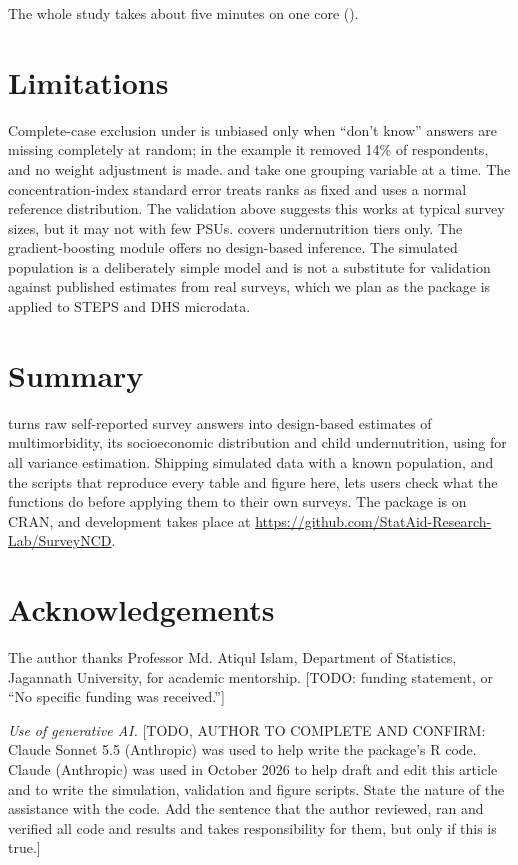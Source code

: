 The whole study takes about five minutes on one core ().

\section{Limitations}

Complete-case exclusion under  is unbiased only when ``don't know'' answers are missing completely at random; in the example it removed 14\% of respondents, and no weight adjustment is made.  and  take one grouping variable at a time. The concentration-index standard error treats ranks as fixed and uses a normal reference distribution. The validation above suggests this works at typical survey sizes, but it may not with few PSUs.  covers undernutrition tiers only. The gradient-boosting module offers no design-based inference. The simulated population is a deliberately simple model and is not a substitute for validation against published estimates from real surveys, which we plan as the package is applied to STEPS and DHS microdata.

\section{Summary}

 turns raw self-reported survey answers into design-based estimates of multimorbidity, its socioeconomic distribution and child undernutrition, using  for all variance estimation. Shipping simulated data with a known population, and the scripts that reproduce every table and figure here, lets users check what the functions do before applying them to their own surveys. The package is on CRAN, and development takes place at \url{https://github.com/StatAid-Research-Lab/SurveyNCD}.

\section{Acknowledgements}

The author thanks Professor Md. Atiqul Islam, Department of Statistics, Jagannath University, for academic mentorship. [TODO: funding statement, or ``No specific funding was received.'']

\emph{Use of generative AI.} [TODO, AUTHOR TO COMPLETE AND CONFIRM: Claude Sonnet 5.5 (Anthropic) was used to help write the package's R code. Claude (Anthropic) was used in October 2026 to help draft and edit this article and to write the simulation, validation and figure scripts. State the nature of the assistance with the code. Add the sentence that the author reviewed, ran and verified all code and results and takes responsibility for them, but only if this is true.]



\address{%
Sujon Mia\\
StatAid Research Lab\\
Department of Statistics, Jagannath University\\
Dhaka, Bangladesh\\
\textit{ORCID: \href{https://orcid.org/0009-0001-1032-2818}{0009-0001-1032-2818}}\\
\href{mailto:sujonsgc@gmail.com}{\nolinkurl{sujonsgc@gmail.com}}%
}
